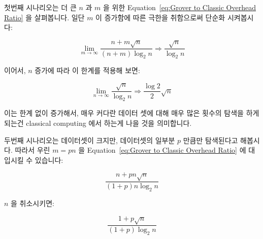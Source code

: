 첫번째 시나리오는 더 큰 $n$ 과 $m$ 을 위한
Equation~\ref{eq:Grover to Classic Overhead Ratio}
을 살펴봅니다.
일단 $m$ 이 증가함에 따른 극한을 취함으로써 단순화 시켜봅시다:

\begin{equation}
	\lim_{m\to\infty} \frac{n + m \sqrt n}{\left( n + m \right) \log_2 n}
	\Rightarrow \frac{\sqrt n}{\log_2 n}
\label{eq:sqrt n by log 2 n}
\end{equation}

이어서, $n$ 증가에 따라 이 한계를 적용해 보면:

\begin{equation}
	\lim_{n\to\infty} \frac{\sqrt n}{\log_2 n}
	\Rightarrow \frac{\log 2}{2} \sqrt n
\end{equation}

이는 한계 없이 증가해서, 매우 커다란 데이터 셋에 대해 매우 많은 횟수의 탐색을
하게 되는건 classical computing 에서 하는게 나을 것을 의미합니다.

두번째 시나리오는 데이터셋이 크지만, 데이터셋의 일부분 $p$ 만큼만 탐색된다고 해봅시다.
따라서 우린 $m = pn$ 을
Equation~\ref{eq:Grover to Classic Overhead Ratio} 에 대입시킬 수 있습니다:

\begin{equation}
	\frac{n + p n \sqrt n}{\left( 1 + p \right) n \log_2 n}
\end{equation}

$n$ 을 취소시키면:

\begin{equation}
	\frac{1 + p \sqrt n}{\left( 1 + p \right) \log_2 n}
\end{equation}

